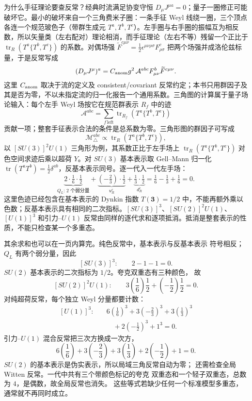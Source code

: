 为什么手征理论要查反常？经典时流满足协变守恒 $D_\mu J^{\mu a}=0$；量子一圈修正可能破坏它。最小的破坏来自一个三角费米子圈：一条手征 Weyl 线绕一圈，三个顶点各连一个规范玻色子（带群生成元 $T^a,T^b,T^c$）。左手圈与右手圈的振幅互为相反数，所以矢量类（左右配对）理论相消，而手征理论（左右不等）残留一个正比于 $\operatorname{tr}_R(T^a\{T^b,T^c\})$ 的系数。对偶场强 $\widetilde F^{c\mu\nu}=\tfrac12\epsilon^{\mu\nu\rho\sigma}F^c_{\rho\sigma}$ 把两个场强并成洛伦兹标量，于是反常写成
\[
(D_\mu J^{\mu})^a
=C_{\rm anom}g^2\,\mathcal A^{abc}
F^b_{\mu\nu}\widetilde F^{c\mu\nu}.
\]
这里 $C_{\rm anom}$ 取决于流的定义及 consistent/covariant 反常约定；本书只用群因子及其是否为零，不以未指定流的归一化报告一个通用系数。三角图的计算属于量子场论输入：每个左手 Weyl 场按它在规范群表示 $R_f$ 中的迹
\[
\mathcal A^{abc}=\sum_{f\,\mathrm{left}}
\operatorname{tr}_{R_f}\!\left(T^a\{T^b,T^c\}\right)
\]
贡献一项；整套手征表示合法的条件是总系数为零。三角形图的群因子可写成
\[
\mathcal M^{abc}_{\triangle}\propto
\operatorname{tr}_R\!\left(T^a\{T^b,T^c\}\right),
\]
以 $[SU(3)]^2U(1)$ 三角形为例，其系数正比于左手场上 $\operatorname{tr}_R(T^a\{T^b,T^c\})$ 对色空间求迹后乘以超荷 $Y$。对 $SU(3)$ 基本表示取 Gell--Mann 归一化 $\operatorname{tr}(T^aT^b)=\tfrac12\delta^{ab}$，反基本表示同号。逐一代入一代左手场：
\[
\underbrace{2\cdot\tfrac16\cdot\tfrac12}_{Q_L:\,2\text{ 个弱分量}}
+\underbrace{(-\tfrac23)\cdot\tfrac12}_{u_R^c}
+\underbrace{\tfrac13\cdot\tfrac12}_{d_R^c}
=\tfrac16-\tfrac13+\tfrac16=0.
\]
这里色迹已经包含在基本表示的 Dynkin 指数 $T(\mathbf3)=1/2$ 中，不能再额外乘以色数；反基本表示具有相同的二次指标。$[SU(3)]^3$、$[SU(2)]^2U(1)$、$[U(1)]^3$ 和引力--$U(1)$ 反常由同样的逐代求和逐项抵消。抵消是整套表示的性质，不能只检查某一个多重态。

其余求和也可以在一页内算完。纯色反常中，基本表示与反基本表示
符号相反；$Q_L$ 有两个弱分量，因此
\[
[SU(3)]^3:\qquad 2-1-1=0.
\]
$SU(2)$ 基本表示的二次指标为 $1/2$。夸克双重态有三种颜色，
故
\[
[SU(2)]^2U(1):\qquad
3\left(\frac16\right)\frac12
+\left(-\frac12\right)\frac12=0.
\]
对纯超荷反常，每个独立 Weyl 分量都要计数：
\[
\begin{aligned}
[U(1)]^3:\quad&
6\left(\frac16\right)^3
+3\left(-\frac23\right)^3
+3\left(\frac13\right)^3\\
&\quad
+2\left(-\frac12\right)^3+1^3=0.
\end{aligned}
\]
引力--$U(1)$ 混合反常把三次方换成一次方，
\[
6\left(\frac16\right)
+3\left(-\frac23\right)
+3\left(\frac13\right)
+2\left(-\frac12\right)+1=0.
\]
$SU(2)$ 的基本表示是伪实表示，所以局域三角反常自动为零；
还需检查全局 Witten 反常。一代中共有三个带颜色标记的夸克
双重态和一个轻子双重态，总数为 $4$，是偶数，故全局反常也消失。
这些等式若缺少任何一个标准模型多重态，通常就不再同时成立。

